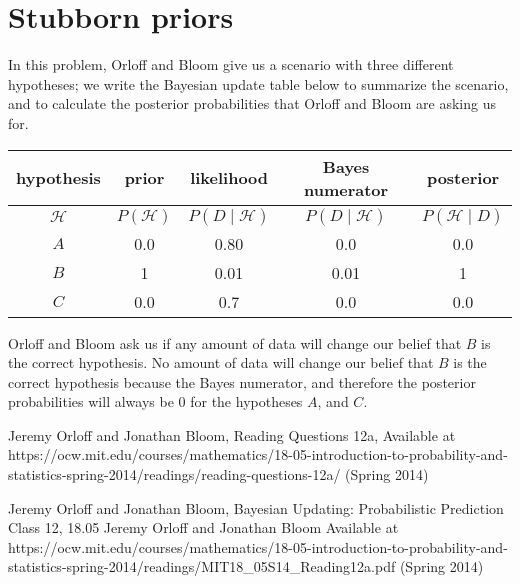 \documentclass{article}
\begin{document}
\section{Stubborn priors}
In this problem, Orloff and Bloom give us a scenario with three
different hypotheses; we write the Bayesian update table below
to summarize the scenario, and to calculate the posterior probabilities
that Orloff and Bloom are asking us for.

\begin{center}
\begin{tabular}{ | c | c | c | c  | c | }
    \hline
    hypothesis & prior & likelihood & Bayes numerator & posterior\\ \hline
    $\mathcal{H}$ & $P\left(\mathcal{H}\right)$ & $P\left(D \mid \mathcal{H}\right)$ & $P\left(D \mid \mathcal{H} \right)$ & $P\left(\mathcal{H} \mid D \right)$ \\ \hline
    $A$ & 0.0  & 0.80 & 0.0  & 0.0 \\ \hline
    $B$ & 1    & 0.01 & 0.01 & 1   \\ \hline
    $C$ & 0.0  & 0.7 & 0.0   & 0.0 \\ \hline
  \end{tabular}
\end{center}

Orloff and Bloom ask us if any amount of data will change our belief that
$B$ is the correct hypothesis.  No amount of data will change our belief
that $B$ is the correct hypothesis because the Bayes numerator, and
therefore the posterior probabilities will always be 0 for the hypotheses
$A$, and $C$.

\begin{thebibliography}{99}
Jeremy Orloff and Jonathan Bloom,
Reading Questions 12a,
Available at https://ocw.mit.edu/courses/mathematics/18-05-introduction-to-probability-and-statistics-spring-2014/readings/reading-questions-12a/
(Spring 2014)

Jeremy Orloff and Jonathan Bloom,
Bayesian Updating: Probabilistic Prediction Class 12, 18.05 Jeremy Orloff and 
Jonathan Bloom
Available at https://ocw.mit.edu/courses/mathematics/18-05-introduction-to-probability-and-statistics-spring-2014/readings/MIT18_05S14_Reading12a.pdf
(Spring 2014)

\end{thebibliography}
\end{document}
